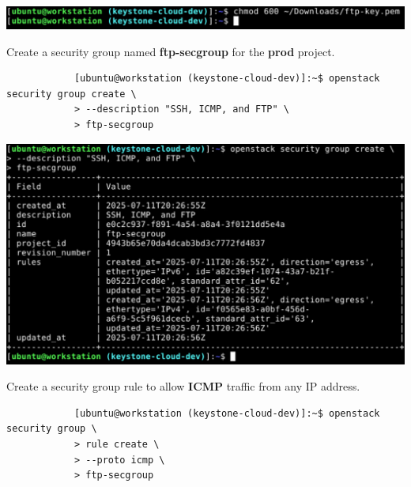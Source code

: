 \documentclass[letterpaper, 12pt]{article}
\begin{document}
\begin{enumerate}
\begin{labstep}
        \begin{center}
            \includegraphics[width=\linewidth]{images/part1/step33.png}
        \end{center}
    \end{labstep}

    \begin{labstep}
        Create a security group named \textbf{ftp-secgroup} for the \textbf{prod} project.
        \begin{lstlisting}
            [ubuntu@workstation (keystone-cloud-dev)]:~$ openstack security group create \
            > --description "SSH, ICMP, and FTP" \
            > ftp-secgroup
        \end{lstlisting}

        \begin{center}
            \includegraphics[width=\linewidth]{images/part1/step34.png}
        \end{center}
    \end{labstep}

    \begin{labstep}
        Create a security group rule to allow \textbf{ICMP} traffic from any IP address.
        \begin{lstlisting}
            [ubuntu@workstation (keystone-cloud-dev)]:~$ openstack security group \
            > rule create \
            > --proto icmp \
            > ftp-secgroup
        \end{lstlisting}


\end{labstep}
\end{enumerate}
\end{document}
